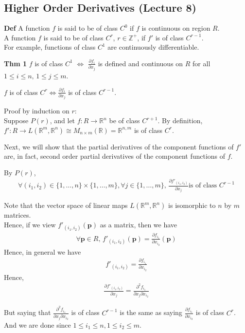 \documentclass{article}
\begin{document}
\subsection{Higher Order Derivatives (Lecture 8)}
\textbf{Def} A function $f$ is said to be of class $C^0$ if $f$ is continuous on region $R$.\\
A function $f$ is said to be of class $C^r$, $r\in \mathbb{Z^+}$, if $f'$ is of class $C^{r-1}$.\\
For example, functions of class $C^1$ are continuously differentiable.

\textbf{Thm 1} $f$ is of class $C^1$ $\iff$ $\frac{\partial f_i}{\partial x_j}$ is defined and continuous on $R$ for all $1\leq i\leq n,\, 1\leq j \leq m$. 


$f$ is of class $C^r \iff \frac{\partial f_i}{\partial x_j}$ is of class $C^{r-1}$.

Proof by induction on $r$:\\
Suppose $P(r)$, and let $f: R\rightarrow \mathbb{R}^n$ be of class $C^{r+1}$. By definition, $f': R \rightarrow L(\mathbb{R}^m, \mathbb{R}^n) \cong M_{n\times m}(\mathbb{R}) = \mathbb{R}^{n,m}$ is of class $C^r$.

Next, we will show that the partial derivatives of the component functions of $f'$ are, in fact, second order partial derivatives of the component functions of $f$.

By $P(r)$,  
\begin{align*}
	\forall (i_1,i_2)\in \{1,\dots, n\}\times \{1,\dots, m\}, \forall j\in \{1,\dots, m\}, \, \frac{\partial f'_{(i_1, i_2)}}{\partial x_j} \text{is of class } C^{r-1}
\end{align*}

Note that the vector space of linear maps $L(\mathbb{R}^m, \mathbb{R}^n)$ is isomorphic to $n$ by $m$ matrices.\\
Hence, if we view $f'_{(i_1, i_2)}(\mathbf{p})$ as a matrix, then we have
\begin{align*}
	\forall \mathbf{p}\in R, \, f'_{(i_1, i_2)}(\mathbf{p}) = \frac{\partial f_{i_1}}{\partial x_{i_2}}(\mathbf{p})
\end{align*}
Hence, in general we have
\begin{align*}
	f'_{(i_1, i_2)} = \frac{\partial f_{i_1}}{\partial x_{i_2}}
\end{align*}
Hence, 
\begin{align*}
	\frac{\partial f'_{(i_1, i_2)}}{\partial x_j} = \frac{\partial^2 f_{i_1}}{\partial x_j \partial x_{i_2}}
\end{align*}

But saying that $\frac{\partial^2 f_{i_1}}{\partial x_j \partial x_{i_2}}$ is of class $C^{r-1}$ is the same as saying $\frac{\partial f_{i_1}}{\partial x_{i_2}}$ is of class $C^r$. And we are done since $1\leq i_1\leq n, 1\leq i_2\leq m$.
\end{document}
